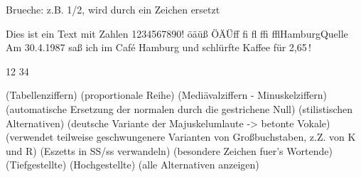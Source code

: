 \documentclass{fontdoku}
\def\TEXT{%
Dies ist ein Text mit Zahlen 1234567890!\newline%
öäüß ÖÄÜ\quad ff fi fl ffi ffl\quad Hamburg\quad Quelle\newline%
Am 30.4.1987 saß ich im \glqq{}Caf\'e Hamburg\grqq{} und schlürfte Kaffee für 2,65\,\libertineEuro!
}
\begin{document}

Brueche: z.B. 1/2, wird durch ein Zeichen ersetzt

\begin{lstsample}[hpos=l,lstsize=0.4,codesize=0.4,toprule,bottomrule]
\TEXT

12 34
\end{lstsample}





 (Tabellenziffern)
 (proportionale Reihe)
 (Mediävalziffern - Minuskelziffern)
 (automatische Ersetzung der normalen durch die gestrichene Null)
 (stilistischen Alternativen)
 (deutsche Variante der Majuskelumlaute -> betonte Vokale)
 (verwendet teilweise geschwungenere Varianten von Großbuchstaben, z.Z. von K und R)
 (Eszetts in SS/ss verwandeln)
 (besondere Zeichen fuer's Wortende)
 (Tiefgestellte)
 (Hochgestellte)
 (alle Alternativen anzeigen)
\end{document}
